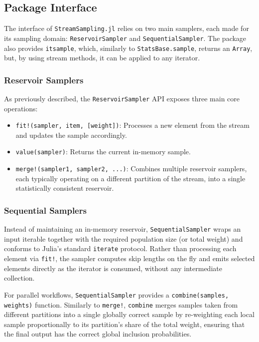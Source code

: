 \documentclass{juliacon}
\begin{document}
\subsection{Package Interface}

The interface of \texttt{StreamSampling.jl} relies on two main samplers, each made for its sampling domain: \texttt{ReservoirSampler} and \texttt{SequentialSampler}. The package also provides \texttt{itsample}, which, similarly to \texttt{StatsBase.sample}, returns an \texttt{Array}, but, by using stream methods, it can be applied to any iterator.

\subsubsection{Reservoir Samplers}

As previously described, the \texttt{ReservoirSampler} API exposes three main core operations:

\begin{itemize}
    \item \texttt{fit!(sampler, item, [weight])}: Processes a new element from the stream and updates the sample accordingly.
    \item \texttt{value(sampler)}: Returns the current in-memory sample.
    \item \texttt{merge!(sampler1, sampler2, ...)}: Combines multiple reservoir samplers, each typically operating on a different partition of the stream, into a single statistically consistent reservoir.
\end{itemize}

\subsubsection{Sequential Samplers}

Instead of maintaining an in-memory reservoir, \texttt{SequentialSampler} wraps an input iterable together with the required population size (or total weight) and conforms to Julia's standard \texttt{iterate} protocol. Rather than processing each element via \texttt{fit!}, the sampler computes skip lengths on the fly and emits selected elements directly as the iterator is consumed, without any intermediate collection.

For parallel workflows, \texttt{SequentialSampler} provides a \texttt{combine(samples, weights)} function. Similarly to \texttt{merge!}, \texttt{combine} merges samples taken from different partitions into a single globally correct sample by re-weighting each local sample proportionally to its partition's share of the total weight, ensuring that the final output has the correct global inclusion probabilities.
\end{document}
